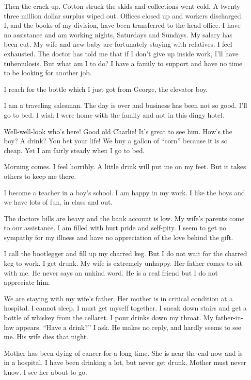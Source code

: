 Then the crack-up. Cotton struck the skids and collections went cold. A twenty three million dollar surplus wiped out. Offices closed up and workers discharged. I, and the books of my division, have been transferred to the head office. I have no assistance and am working nights, Saturdays and Sundays. My salary has been cut. My wife and new baby are fortunately staying with relatives. I feel exhausted. The doctor has told me that if I don’t give up inside work, I’ll have tuberculosis. But what am I to do? I have a family to support and have no time to be looking for another job.

I reach for the bottle which I just got from George, the elevator boy.

I am a traveling salesman. The day is over and business has been not so good. I’ll go to bed. I wish I were home with the family and not in this dingy hotel.

Well-well-look who’s here! Good old Charlie! It’s great to see him. How’s the boy? A drink? You bet your life! We buy a gallon of “corn” because it is so cheap. Yet I am fairly steady when I go to bed.

Morning comes. I feel horribly. A little drink will put me on my feet. But it takes others to keep me there.

I become a teacher in a boy’s school. I am happy in my work. I like the boys and we have lots of fun, in class and out.

      The doctors bills are heavy and the bank account is low. My wife’s parents come to our assistance. I am filled with hurt pride and self-pity. I seem to get no sympathy for my illness and have no appreciation of the love behind the gift.

I call the bootlegger and fill up my charred keg. But I do not wait for the charred keg to work. I get drunk. My wife is extremely unhappy. Her father comes to sit with me. He never says an unkind word. He is a real friend but I do not appreciate him.

We are staying with my wife’s father. Her mother is in critical condition at a hospital. I cannot sleep. I must get myself together. I sneak down stairs and get a bottle of whiskey from the cellaret. I pour drinks down my throat. My father-in-law appears. “Have a drink?” I ask. He makes no reply, and hardly seems to see me. His wife dies that night.

Mother has been dying of cancer for a long time. She is near the end now and is in a hospital. I have been drinking a lot, but never get drunk. Mother must never know. I see her about to go.

